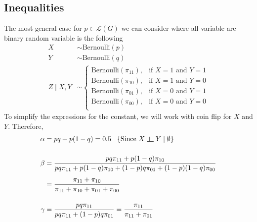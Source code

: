 \documentclass{article}
\numberwithin{equation}{section}
\newcommand{\s}{\hspace{0.1cm}}
\newcommand{\indep}{\s \rotatebox[origin=c]{90}{$\models$}\s }
\theoremstyle{named}
\begin{document}
\subsection{Inequalities}
The most general case for $p \in \mathcal{L}(G)$ we can consider where all variable 
are binary random variable is the following 
\begin{align*}
        X & \sim \text{Bernoulli}(p) \\
        Y &\sim \text{Bernoulli}(q) \\[4ex]
        Z \mid X, Y &\sim \left\{ 
                \begin{array}{cc}
                \text{Bernoulli}(\pi_{11}),& \text{if } X = 1 \text{ and } Y = 1 \\
                \text{Bernoulli}(\pi_{10}),& \text{if } X = 1 \text{ and } Y = 0 \\
                \text{Bernoulli}(\pi_{01}),& \text{if } X = 0 \text{ and } Y = 1 \\
                \text{Bernoulli}(\pi_{00}),& \text{if } X = 0 \text{ and } Y = 0 \\
        \end{array}
        \right.
\end{align*}
To simplify the expressions for the constant, we will work with coin flip for $X$ and 
$Y$. Therefore,
\begin{align}
        \label{eq:alpha}
        \alpha &= pq + p(1 - q) = 0.5 \s\s\s \{\text{Since } X \indep Y \mid 
        \emptyset\}\\[3ex]
        \nonumber
        \beta &= \frac{pq\pi_{11} + p(1 - q) \pi_{10}}{pq\pi_{11} + p(1 - q) \pi_{10} + 
        (1 - p)q \pi_{01} + (1 - p)(1 - q)\pi_{00}}  \\[1ex]
        \label{eq:beta}
        &= \frac{\pi_{11} + \pi_{10}}{\pi_{11} + \pi_{10} + \pi_{01} + \pi_{00}} \\[3ex]
        \label{eq:gamma}
        \gamma &=  \frac{pq \pi_{11}}{pq \pi_{11} + (1 - p)q \pi_{01}} = 
        \frac{\pi_{11}}{\pi_{11} + \pi_{01}}
\end{align}
\end{document}
